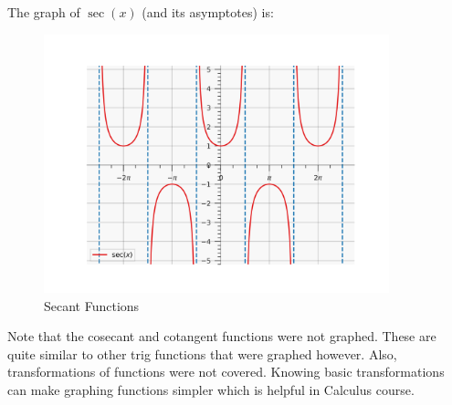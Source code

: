 \documentclass[12pt]{article}
\theoremstyle{definition}
\begin{document}
The graph of $\sec(x)$ (and its asymptotes) is:

\begin{figure}[H]
    \centering
    \includegraphics[width=10cm, keepaspectratio]{graph_15.png}
    \caption{Secant Functions}
    \label{fig:fig15}
\end{figure}

Note that the cosecant and cotangent functions were not graphed.
These are quite similar to other trig functions that were graphed however.
Also, transformations of functions were not covered.
Knowing basic transformations can make graphing functions simpler which is helpful in Calculus course.
\end{document}
